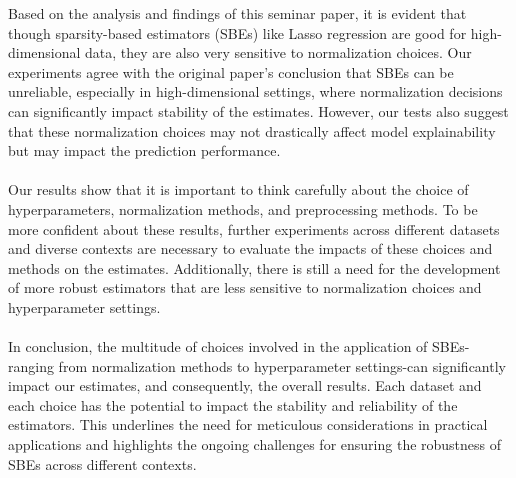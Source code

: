 Based on the analysis and findings of this seminar paper, it is evident that though sparsity-based estimators (SBEs) like Lasso regression are good for high-dimensional data, they are also very sensitive to normalization choices. Our experiments agree with the original paper's conclusion that SBEs can be unreliable, especially in high-dimensional settings, where normalization decisions can significantly impact stability of the estimates. However, our tests also suggest that these normalization choices may not drastically affect model explainability but may impact the prediction performance.\\
\\
Our results show that it is important to think carefully about the choice of hyperparameters, normalization methods, and preprocessing methods. To be more confident about these results, further experiments across different datasets and diverse contexts are necessary to evaluate the impacts of these choices and methods on the estimates. Additionally, there is still a need for the development of more robust estimators that are less sensitive to normalization choices and hyperparameter settings. \\
\\
In conclusion, the multitude of choices involved in the application of SBEs-ranging from normalization methods to hyperparameter settings-can significantly impact our estimates, and consequently, the overall results. Each dataset and each choice has the potential to impact the stability and reliability of the estimators. This underlines the need for meticulous considerations in practical applications and highlights the ongoing challenges for ensuring the robustness of SBEs across different contexts.
